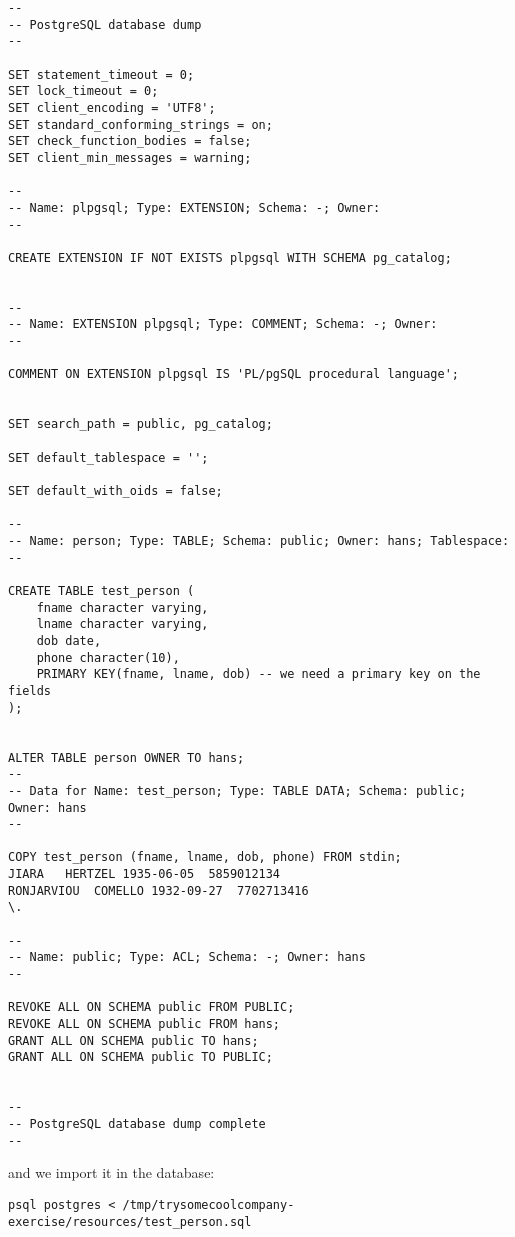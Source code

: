 \documentclass[11pt]{article}
\begin{document}
\begin{verbatim}
--
-- PostgreSQL database dump
--

SET statement_timeout = 0;
SET lock_timeout = 0;
SET client_encoding = 'UTF8';
SET standard_conforming_strings = on;
SET check_function_bodies = false;
SET client_min_messages = warning;

--
-- Name: plpgsql; Type: EXTENSION; Schema: -; Owner: 
--

CREATE EXTENSION IF NOT EXISTS plpgsql WITH SCHEMA pg_catalog;


--
-- Name: EXTENSION plpgsql; Type: COMMENT; Schema: -; Owner: 
--

COMMENT ON EXTENSION plpgsql IS 'PL/pgSQL procedural language';


SET search_path = public, pg_catalog;

SET default_tablespace = '';

SET default_with_oids = false;

--
-- Name: person; Type: TABLE; Schema: public; Owner: hans; Tablespace: 
--

CREATE TABLE test_person (
    fname character varying,
    lname character varying,
    dob date,
    phone character(10),
    PRIMARY KEY(fname, lname, dob) -- we need a primary key on the fields
);


ALTER TABLE person OWNER TO hans;
--
-- Data for Name: test_person; Type: TABLE DATA; Schema: public; Owner: hans
--

COPY test_person (fname, lname, dob, phone) FROM stdin;
JIARA	HERTZEL	1935-06-05	5859012134
RONJARVIOU	COMELLO	1932-09-27	7702713416
\.

--
-- Name: public; Type: ACL; Schema: -; Owner: hans
--

REVOKE ALL ON SCHEMA public FROM PUBLIC;
REVOKE ALL ON SCHEMA public FROM hans;
GRANT ALL ON SCHEMA public TO hans;
GRANT ALL ON SCHEMA public TO PUBLIC;


--
-- PostgreSQL database dump complete
--
\end{verbatim}

and we import it in the database:

\begin{verbatim}
psql postgres < /tmp/trysomecoolcompany-exercise/resources/test_person.sql
\end{verbatim}
\end{document}
